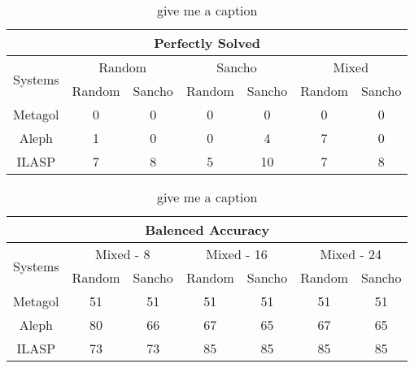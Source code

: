 \begin{table}[]
	\begin{tabular}{|c|c|c|c|c|c|c|}
		\hline
		\multicolumn{7}{|c|}{Perfectly Solved}                                                                            \\ \hline
		\multirow{2}{*}{Systems} & \multicolumn{2}{c|}{Random} & \multicolumn{2}{c|}{Sancho} & \multicolumn{2}{c|}{Mixed} \\ \cline{2-7}
		& Random       & Sancho       & Random       & Sancho       & Random       & Sancho      \\ \hline
		Metagol                  & 0            & 0            & 0            & 0            & 0            & 0           \\ \hline
		Aleph                    & 1            & 0            & 0            & 4            & 7            & 0           \\ \hline
		ILASP                    & 7            & 8            & 5            & 10           & 7            & 8           \\ \hline
	\end{tabular}
	\label{givemeaname}
	\caption{\ac{give me a caption}}
\end{table}

\begin{table}[]
	\begin{tabular}{|c|c|c|c|c|c|c|}
		\hline
		\multicolumn{7}{|c|}{Balenced Accuracy}                                                                                       \\ \hline
		\multirow{2}{*}{Systems} & \multicolumn{2}{c|}{Mixed - 8} & \multicolumn{2}{c|}{Mixed - 16} & \multicolumn{2}{c|}{Mixed - 24} \\ \cline{2-7}
		& Random         & Sancho        & Random         & Sancho         & Random         & Sancho         \\ \hline
		Metagol                  & 51             & 51            & 51             & 51             & 51             & 51             \\ \hline
		Aleph                    & 80             & 66            & 67             & 65             & 67             & 65             \\ \hline
		ILASP                    & 73             & 73            & 85             & 85             & 85             & 85             \\ \hline
	\end{tabular}
	\label{givemeaname}
	\caption{\ac{give me a caption}}
\end{table}

